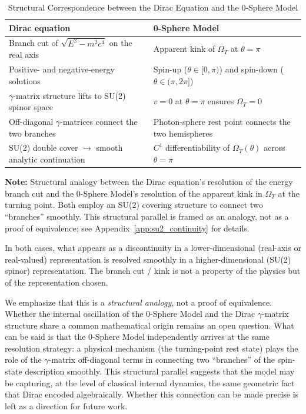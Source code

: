 \documentclass[%
 reprint,
 amsmath,amssymb,
 aps,
 prb,
]{revtex4-2}
\numberwithin{equation}{section}
\theoremstyle{definition}
\theoremstyle{remark}
\begin{document}
\begin{table}[t!]
\centering
\caption{Structural Correspondence between the Dirac Equation and the 0-Sphere Model}
\label{tab:dirac_0sphere}
\renewcommand{\arraystretch}{1.4}
\begin{tabular}{p{7.5cm}p{7.5cm}}
\toprule
\textbf{Dirac equation} & \textbf{0-Sphere Model} \\
\midrule
Branch cut of $\sqrt{E^2 - m^2c^4}$ on the real axis & Apparent kink of $\Omega_T$ at $\theta = \pi$ \\
\addlinespace[0.25cm]
Positive- and negative-energy solutions & Spin-up ($\theta \in [0,\pi)$) and spin-down ($\theta \in (\pi, 2\pi]$) \\
\addlinespace[0.25cm]
$\gamma$-matrix structure lifts to SU(2) spinor space & $v = 0$ at $\theta = \pi$ ensures $\Omega_T = 0$ \\
\addlinespace[0.25cm]
Off-diagonal $\gamma$-matrices connect the two branches & Photon-sphere rest point connects the two hemispheres \\
\addlinespace[0.25cm]
SU(2) double cover $\to$ smooth analytic continuation & $C^1$ differentiability of $\Omega_T(\theta)$ across $\theta = \pi$ \\
\bottomrule
\end{tabular}
\vspace{0.2cm}
\begin{flushleft}
\footnotesize
\textbf{Note:} Structural analogy between the Dirac equation's resolution of the energy branch cut and the 0-Sphere Model's resolution of the apparent kink in $\Omega_T$ at the turning point. Both employ an SU(2) covering structure to connect two ``branches'' smoothly. This structural parallel is framed as an analogy, not as a proof of equivalence; see Appendix~\ref{app:su2_continuity} for details.
\end{flushleft}
\end{table}

In both cases, what appears as a discontinuity in a lower-dimensional (real-axis or real-valued) representation is resolved smoothly in a higher-dimensional (SU(2) spinor) representation. The branch cut / kink is not a property of the physics but of the representation chosen.

We emphasize that this is a \emph{structural analogy}, not a proof of equivalence. Whether the internal oscillation of the 0-Sphere Model and the Dirac $\gamma$-matrix structure share a common mathematical origin remains an open question. What can be said is that the 0-Sphere Model independently arrives at the same resolution strategy: a physical mechanism (the turning-point rest state) plays the role of the $\gamma$-matrix off-diagonal terms in connecting two ``branches'' of the spin-state description smoothly. This structural parallel suggests that the model may be capturing, at the level of classical internal dynamics, the same geometric fact that Dirac encoded algebraically. Whether this connection can be made precise is left as a direction for future work.
\end{document}
